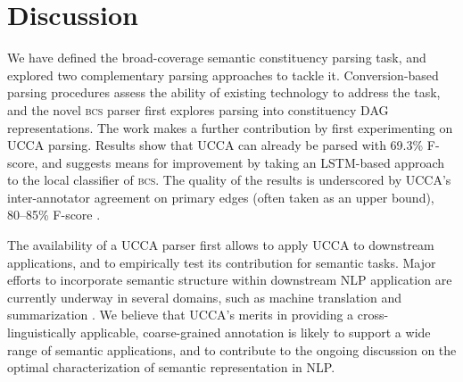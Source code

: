 \documentclass[11pt]{article}
\begin{document}
\section{Discussion}\label{sec:discussion}

We have defined the broad-coverage semantic constituency parsing task,
and explored two complementary parsing approaches to tackle it.
Conversion-based parsing procedures assess the ability of existing
technology to address the task, and the novel \textsc{bcs} parser first
explores parsing into constituency DAG representations.
The work makes a further contribution by first experimenting on UCCA parsing.
Results show that UCCA can already be parsed with 69.3\% F-score,
and suggests means for improvement by taking an LSTM-based
approach to the local classifier of \textsc{bcs}.
The quality of the results is underscored by UCCA's inter-annotator
agreement on primary edges (often taken as an upper bound),
80--85\% F-score \cite{abend2013universal}.



The availability of a UCCA parser first allows to apply UCCA to
downstream applications, and to empirically test its contribution for semantic tasks.
Major efforts to incorporate semantic structure within downstream NLP application
are currently underway in several domains,
such as machine translation \cite{jones2012semantics} and summarization \cite{liu2015toward}.
We believe that UCCA's merits in providing a cross-linguistically applicable, coarse-grained
annotation is likely to support a wide range of semantic applications, and to contribute to
the ongoing discussion on the optimal characterization of semantic representation in NLP.
\end{document}
